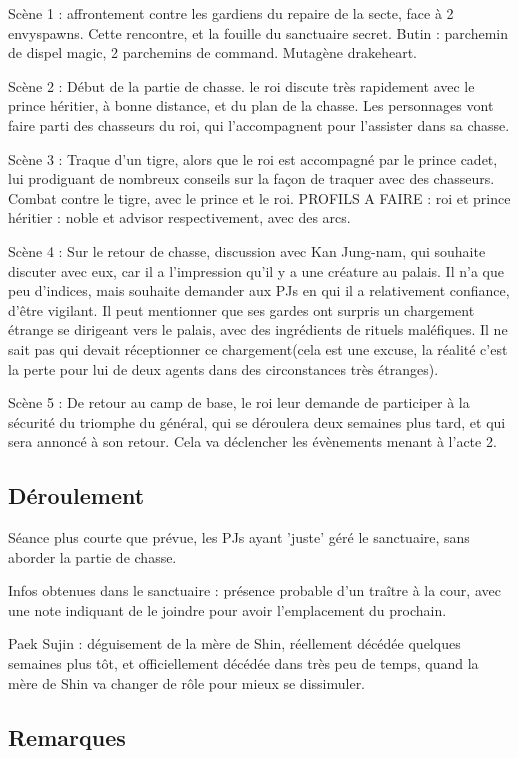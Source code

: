 \documentclass[10pt,a4paper]{book}
\begin{document}
Scène 1 : affrontement contre les gardiens du repaire de la secte, face à 2 envyspawns. Cette rencontre, et la fouille du sanctuaire secret. Butin :  parchemin de dispel magic, 2 parchemins de command. Mutagène drakeheart. 

Scène 2 : Début de la partie de chasse. le roi discute très rapidement avec le prince héritier, à bonne distance, et du plan de la chasse. Les personnages vont faire parti des chasseurs du roi, qui l'accompagnent pour l'assister dans sa chasse.

Scène 3 : Traque d'un tigre, alors que le roi est accompagné par le prince cadet, lui prodiguant de nombreux conseils sur la façon de traquer avec des chasseurs. Combat contre le tigre, avec le prince et le roi. PROFILS A FAIRE : roi et prince héritier : noble et advisor respectivement, avec des arcs.

Scène 4 : Sur le retour de chasse, discussion avec Kan Jung-nam, qui souhaite discuter avec eux, car il a l'impression qu'il y a une créature au palais. Il n'a que peu d'indices, mais souhaite demander aux PJs en qui il a relativement confiance, d'être vigilant. Il peut mentionner que ses gardes ont surpris un chargement étrange se dirigeant vers le palais, avec des ingrédients de rituels maléfiques. Il ne sait pas qui devait réceptionner ce chargement(cela est une excuse, la réalité c'est la perte pour lui de deux agents dans des circonstances très étranges).

Scène 5 : De retour au camp de base, le roi leur demande de participer à la sécurité du triomphe du général, qui se déroulera deux semaines plus tard, et qui sera annoncé à son retour. Cela va déclencher les évènements menant à l'acte 2.
\subsection{Déroulement}

Séance plus courte que prévue, les PJs ayant 'juste' géré le sanctuaire, sans aborder la partie de chasse.

Infos obtenues dans le sanctuaire : présence probable d'un traître à la cour, avec une note indiquant de le joindre pour avoir l'emplacement du prochain.

Paek Sujin : déguisement de la mère de Shin, réellement décédée quelques semaines plus tôt, et officiellement décédée dans très peu de temps, quand la mère de Shin va changer de rôle pour mieux se dissimuler.
\subsection{Remarques}
\end{document}
